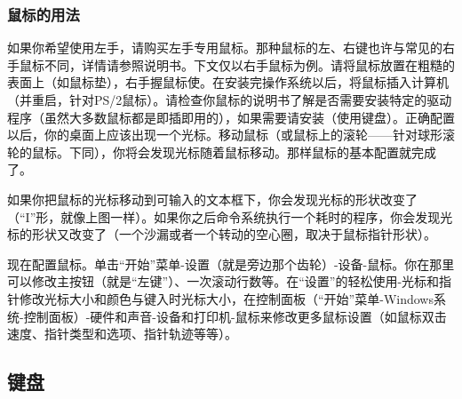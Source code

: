 \subsubsection{鼠标的用法}
如果你希望使用左手，请购买左手专用鼠标。那种鼠标的左、右键也许与常见的右手鼠标不同，详情请参照说明书。下文仅以右手鼠标为例。请将鼠标放置在粗糙的表面上（如鼠标垫），右手握鼠标使。在安装完操作系统以后，将鼠标插入计算机（并重启，针对PS/2鼠标）。请检查你鼠标的说明书了解是否需要安装特定的驱动程序（虽然大多数鼠标都是即插即用的），如果需要请安装（使用键盘）。正确配置以后，你的桌面上应该出现一个光标。移动鼠标（或鼠标上的滚轮——针对球形滚轮的鼠标。下同），你将会发现光标随着鼠标移动。那样鼠标的基本配置就完成了。\par
如果你把鼠标的光标移动到可输入的文本框下，你会发现光标的形状改变了（“I”形，就像上图一样）。如果你之后命令系统执行一个耗时的程序，你会发现光标的形状又改变了（一个沙漏或者一个转动的空心圈，取决于鼠标指针形状）。\par
现在配置鼠标。单击“开始”菜单-设置（就是旁边那个齿轮）-设备-鼠标。你在那里可以修改主按钮（就是“左键”）、一次滚动行数等。在“设置”的轻松使用-光标和指针修改光标大小和颜色与键入时光标大小，在控制面板（“开始”菜单-Windows系统-控制面板）-硬件和声音-设备和打印机-鼠标来修改更多鼠标设置（如鼠标双击速度、指针类型和选项、指针轨迹等等）。
\subsection{键盘}

